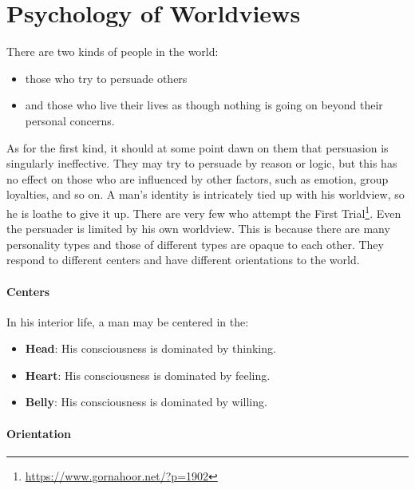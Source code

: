 \section{Psychology of Worldviews}

There are two kinds of people in the world:

\begin{itemize}


\item those who try to persuade others

\item and those who live their lives as though nothing is going on beyond their personal concerns.
\end{itemize}


As for the first kind, it should at some point dawn on them that persuasion is singularly ineffective. They may try to persuade by reason or logic, but this has no effect on those who are influenced by other factors, such as emotion, group loyalties, and so on. A man's identity is intricately tied up with his worldview, so he is loathe to give it up. There are very few who attempt the First Trial\footnote{\url{https://www.gornahoor.net/?p=1902}}. Even the persuader is limited by his own worldview. This is because there are many personality types and those of different types are opaque to each other. They respond to different centers and have different orientations to the world.


\paragraph{Centers}


In his interior life, a man may be centered in the:

\begin{itemize}
\item \textbf{Head}: His consciousness is dominated by thinking.


\item \textbf{Heart}: His consciousness is dominated by feeling.


\item \textbf{Belly}: His consciousness is dominated by willing.

\end{itemize}


\paragraph{Orientation}


